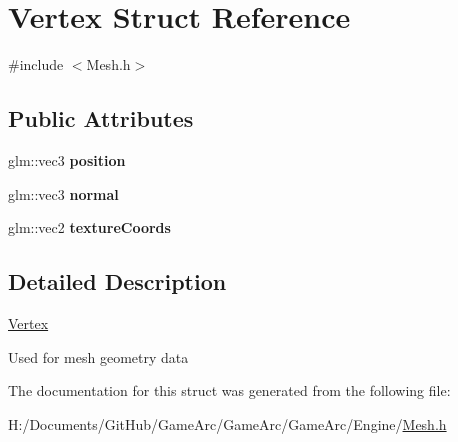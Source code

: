 \hypertarget{struct_vertex}{\section{Vertex Struct Reference}
\label{struct_vertex}
}


{\ttfamily \#include $<$Mesh.\+h$>$}

\subsection*{Public Attributes}
\begin{DoxyCompactItemize}
\item 
\hypertarget{struct_vertex_a030819fdc241743bbd3e180a6b132ed3}{glm\+::vec3 {\bfseries position}}\label{struct_vertex_a030819fdc241743bbd3e180a6b132ed3}

\item 
\hypertarget{struct_vertex_a3aa35fe84025ecf1acccb5f65f5577fd}{glm\+::vec3 {\bfseries normal}}\label{struct_vertex_a3aa35fe84025ecf1acccb5f65f5577fd}

\item 
\hypertarget{struct_vertex_a03ba1fdd25400383cd40bd2153d08ef1}{glm\+::vec2 {\bfseries texture\+Coords}}\label{struct_vertex_a03ba1fdd25400383cd40bd2153d08ef1}

\end{DoxyCompactItemize}


\subsection{Detailed Description}
\hyperlink{struct_vertex}{Vertex}

Used for mesh geometry data 

The documentation for this struct was generated from the following file\+:\begin{DoxyCompactItemize}
\item 
H\+:/\+Documents/\+Git\+Hub/\+Game\+Arc/\+Game\+Arc/\+Game\+Arc/\+Engine/\hyperlink{_mesh_8h}{Mesh.\+h}\end{DoxyCompactItemize}
